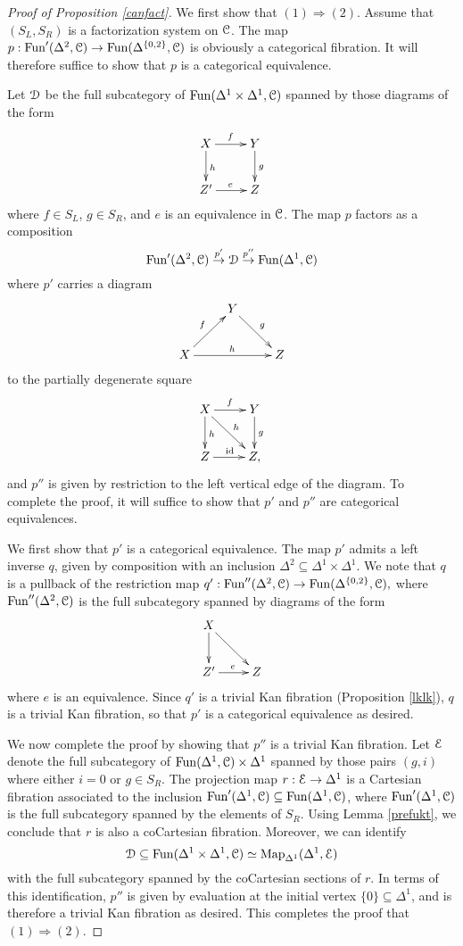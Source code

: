 \begin{proof}[Proof of Proposition \ref{canfact}]
We first show that $(1) \Rightarrow (2)$. Assume that $(S_L, S_R)$ is a factorization system on $\operatorname{\mathcal{C}}$.
The map $p: \operatorname{Fun}'( \Delta^2, \operatorname{\mathcal{C}}) \rightarrow \operatorname{Fun}( \Delta^{ \{0,2\} }, \operatorname{\mathcal{C}})$ is obviously a categorical fibration. It will therefore suffice to show that $p$ is a categorical equivalence.

Let $\operatorname{\mathcal{D}}$ be the full subcategory of $\operatorname{Fun}( \Delta^1 \times \Delta^1, \operatorname{\mathcal{C}})$
spanned by those diagrams of the form
$$\xymatrix{ X \ar[d]^{h} \ar[r]^{f} & Y \ar[d]^{g} \\
Z' \ar[r]^{e} & Z }$$
where $f \in S_L$, $g \in S_R$, and $e$ is an equivalence in $\operatorname{\mathcal{C}}$. The map $p$ factors as a composition
$$ \operatorname{Fun}'(\Delta^2, \operatorname{\mathcal{C}}) \stackrel{p'}{\rightarrow} \operatorname{\mathcal{D}} \stackrel{p''}{\rightarrow} \operatorname{Fun}( \Delta^1, \operatorname{\mathcal{C}})$$
where $p'$ carries a diagram
$$ \xymatrix{ & Y \ar[dr]^{g} & \\
X \ar[rr]^{h} \ar[ur]^{f} & & Z }$$
to the partially degenerate square
$$\xymatrix{ X \ar[d]^{h} \ar[dr]^{h} \ar[r]^{f} & Y \ar[d]^{g} \\
Z \ar[r]^{\id} & Z, }$$
and $p''$ is given by restriction to the left vertical edge of the diagram. To complete the proof, it will suffice to show that $p'$ and $p''$ are categorical equivalences.

We first show that $p'$ is a categorical equivalence.
The map $p'$ admits a left inverse $q$, given by composition with an inclusion
$\Delta^2 \subseteq \Delta^1 \times \Delta^1$. We note that $q$ is a pullback of the restriction map
$q': \operatorname{Fun}''( \Delta^2, \operatorname{\mathcal{C}}) \rightarrow \operatorname{Fun}( \Delta^{ \{0,2 \} }, \operatorname{\mathcal{C}}),$
where $\operatorname{Fun}''( \Delta^2, \operatorname{\mathcal{C}})$ is the full subcategory spanned by diagrams of the form
$$ \xymatrix{ X \ar[dr] \ar[d] & \\
Z' \ar[r]^{e} & Z }$$
where $e$ is an equivalence. Since $q'$ is a trivial Kan fibration (Proposition \ref{lklk}), $q$ is a trivial Kan fibration, so that $p'$ is a categorical equivalence as desired.

We now complete the proof by showing that $p''$ is a trivial Kan fibration. Let
$\operatorname{\mathcal{E}}$ denote the full subcategory of $\operatorname{Fun}( \Delta^1, \operatorname{\mathcal{C}}) \times \Delta^1$ spanned by those pairs
$(g,i)$ where either $i=0$ or $g \in S_R$. The projection map $r: \operatorname{\mathcal{E}} \rightarrow \Delta^1$ is a 
Cartesian fibration associated to the inclusion $\operatorname{Fun}'( \Delta^1, \operatorname{\mathcal{C}}) \subseteq \operatorname{Fun}( \Delta^1, \operatorname{\mathcal{C}})$, where $\operatorname{Fun}'(\Delta^1, \operatorname{\mathcal{C}})$ is the full subcategory spanned by the elements of $S_R$. 
Using Lemma \ref{prefukt}, we conclude that $r$ is also a coCartesian fibration. Moreover,
we can identify
$$ \operatorname{\mathcal{D}} \subseteq \operatorname{Fun}( \Delta^1 \times \Delta^1, \operatorname{\mathcal{C}}) \simeq
\operatorname{{Map}}_{ \Delta^1}( \Delta^1, \operatorname{\mathcal{E}})$$
with the full subcategory spanned by the coCartesian sections of $r$. In terms of this identification,
$p''$ is given by evaluation at the initial vertex $\{0\} \subseteq \Delta^1$, and is therefore
a trivial Kan fibration as desired. This completes the proof that $(1) \Rightarrow (2)$.


\end{proof}
